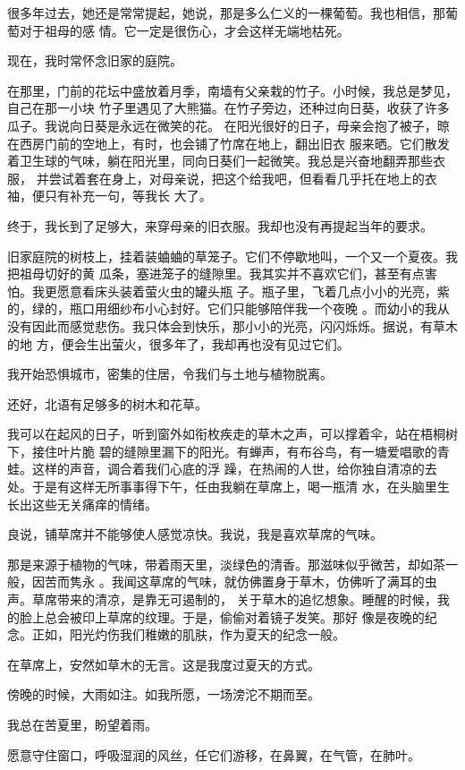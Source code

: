 \documentclass[12pt,a4paper]{article}
\begin{document}
		很多年过去，她还是常常提起，她说，那是多么仁义的一棵葡萄。我也相信，那葡萄对于祖母的感
	情。它一定是很伤心，才会这样无端地枯死。


		现在，我时常怀念旧家的庭院。

		在那里，门前的花坛中盛放着月季，南墙有父亲栽的竹子。小时候，我总是梦见，自己在那一小块
	竹子里遇见了大熊猫。在竹子旁边，还种过向日葵，收获了许多瓜子。我说向日葵是永远在微笑的花。
	在阳光很好的日子，母亲会抱了被子，晾在西房门前的空地上，有时，也会铺了竹席在地上，翻出旧衣
	服来晒。它们散发着卫生球的气味，躺在阳光里，同向日葵们一起微笑。我总是兴奋地翻弄那些衣服，
	并尝试着套在身上，对母亲说，把这个给我吧，但看看几乎托在地上的衣袖，便只有补充一句，等我长
	大了。


		终于，我长到了足够大，来穿母亲的旧衣服。我却也没有再提起当年的要求。


		旧家庭院的树枝上，挂着装蛐蛐的草笼子。它们不停歇地叫，一个又一个夏夜。我把祖母切好的黄
	瓜条，塞进笼子的缝隙里。我其实并不喜欢它们，甚至有点害怕。我更愿意看床头装着萤火虫的罐头瓶
	子。瓶子里，飞着几点小小的光亮，紫的，绿的，瓶口用细纱布小心封好。它们只能够陪伴我一个夜晚
	。而幼小的我从没有因此而感觉悲伤。我只体会到快乐，那小小的光亮，闪闪烁烁。据说，有草木的地
	方，便会生出萤火，很多年了，我却再也没有见过它们。


		我开始恐惧城市，密集的住居，令我们与土地与植物脱离。

		还好，北语有足够多的树木和花草。

		我可以在起风的日子，听到窗外如衔枚疾走的草木之声，可以撑着伞，站在梧桐树下，接住叶片脆
	碧的缝隙里漏下的阳光。有蝉声，有布谷鸟，有一塘爱唱歌的青蛙。这样的声音，调合着我们心底的浮
	躁，在热闹的人世，给你独自清凉的去处。于是有这样无所事事得下午，任由我躺在草席上，喝一瓶清
	水，在头脑里生长出这些无关痛痒的情绪。


		良说，铺草席并不能够使人感觉凉快。我说，我是喜欢草席的气味。


		那是来源于植物的气味，带着雨天里，淡绿色的清香。那滋味似乎微苦，却如茶一般，因苦而隽永
	。我闻这草席的气味，就仿佛置身于草木，仿佛听了满耳的虫声。草席带来的清凉，是靠无可遏制的，
	关于草木的追忆想象。睡醒的时候，我的脸上总会被印上草席的纹理。于是，偷偷对着镜子发笑。那好
	像是夜晚的纪念。正如，阳光灼伤我们稚嫩的肌肤，作为夏天的纪念一般。


		在草席上，安然如草木的无言。这是我度过夏天的方式。

	\endwriting



		傍晚的时候，大雨如注。如我所愿，一场滂沱不期而至。\par
		我总在苦夏里，盼望着雨。\par
		愿意守住窗口，呼吸湿润的风丝，任它们游移，在鼻翼，在气管，在肺叶。
\end{document}
